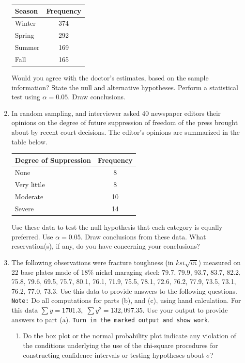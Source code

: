 \documentclass[11pt]{article}
\begin{document}
\begin{enumerate}
\begin{center}
\begin{tabular}{|l|c|} \hline
Season & Frequency \\ \hline
Winter & 374\\ \hline
Spring & 292\\ \hline
Summer & 169\\ \hline
Fall & 165\\ \hline
\end{tabular}
\end{center}
Would you agree with the doctor's estimates, based on the sample information? State the null and alternative hypotheses. Perform a statistical test using $\alpha=0.05$. Draw conclusions.\\[2in]
\item In random sampling, and interviewer asked 40 newspaper editors their opinions on the degree of future suppression of freedom of the press brought about by recent court decisions. The editor's opinions are summarized in the table below. 
\begin{center}
\begin{tabular}{|l|c|} \hline
Degree of Suppression & Frequency \\ \hline
None & 8\\ \hline
Very little & 8\\ \hline
Moderate & 10\\ \hline
Severe & 14\\ \hline
\end{tabular}
\end{center}
Use these data to test the null hypothesis that each category is equally preferred. Use $\alpha=0.05$. Draw conclusions from these data. What reservation(s), if any, do you have concerning your conclusions? \\[2in]
\newpage
\item The following observations were fracture toughness (in $ksi\sqrt{in}$) measured on 22 base plates made of 18\% nickel maraging steel: 79.7, 79.9, 93.7, 83.7, 82.2, 75.8, 79.6, 69.5, 75.7, 80.1, 76.1, 71.9, 75.5, 78.1, 72.6, 76.2, 77.9, 73.5, 73.1, 76.2, 77.0, 73.3. Use this 
data to provide answers to the following questions.\\[.1in]
\texttt{Note:} Do all computations for parts (b), and (c), using 
hand calculation. For this data $\sum{y}=1701.3,$ $\sum{y^2}=132,097.35$. Use your output to provide answers to part (a).
 \texttt{Turn in the marked output and show work}. 
\begin{enumerate}
\item  Do the box plot or the normal probability plot indicate any violation of the conditions
underlying the use of the chi-square procedures for constructing
confidence intervals or testing hypotheses about $\sigma$?\\[2in]


\end{enumerate}
\end{enumerate}
\end{document}
